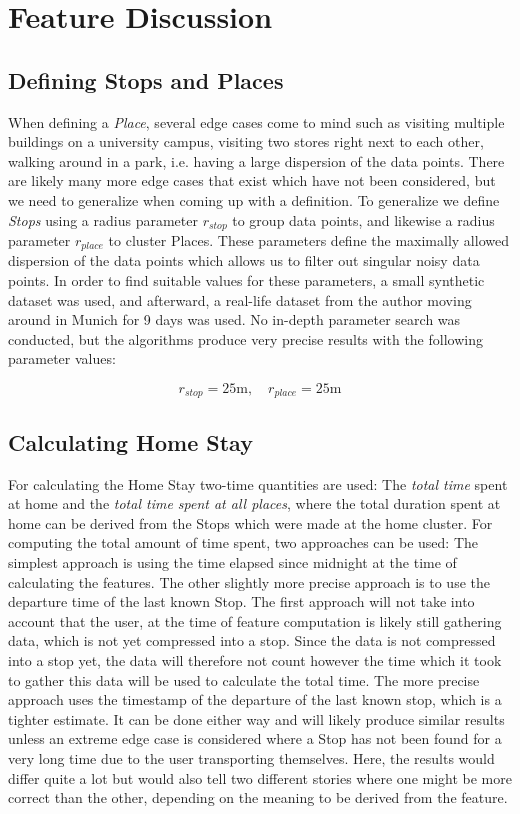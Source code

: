 \section{Feature Discussion}

\subsection{Defining Stops and Places}
When defining a \textit{Place}, several edge cases come to mind such as visiting multiple buildings on a university campus, visiting two stores right next to each other, walking around in a park, i.e. having a large dispersion of the data points. There are likely many more edge cases that exist which have not been considered, but we need to generalize when coming up with a definition. To generalize we define \textit{Stops} using a radius parameter $r_{stop}$ to group data points, and likewise a radius parameter $r_{place}$ to cluster Places. These parameters define the maximally allowed dispersion of the data points which allows us to filter out singular noisy data points. In order to find suitable values for these parameters, a small synthetic dataset was used, and afterward, a real-life dataset from the author moving around in Munich for 9 days was used. No in-depth parameter search was conducted, but the algorithms produce very precise results with the following parameter values:

$$r_{stop} = 25 \text{m}, \quad r_{place} = 25 \text{m}$$

\subsection{Calculating Home Stay}
For calculating the Home Stay two-time quantities are used: The \textit{total time} spent at home and the\textit{ total time spent at all places}, where the total duration spent at home can be derived from the Stops which were made at the home cluster. For computing the total amount of time spent, two approaches can be used: The simplest approach is using the time elapsed since midnight at the time of calculating the features. The other slightly more precise approach is to use the departure time of the last known Stop. The first approach will not take into account that the user, at the time of feature computation is likely still gathering data, which is not yet compressed into a stop. Since the data is not compressed into a stop yet, the data will therefore not count however the time which it took to gather this data will be used to calculate the total time. The more precise approach uses the timestamp of the departure of the last known stop, which is a tighter estimate. It can be done either way and will likely produce similar results unless an extreme edge case is considered where a Stop has not been found for a very long time due to the user transporting themselves. Here, the results would differ quite a lot but would also tell two different stories where one might be more correct than the other, depending on the meaning to be derived from the feature.

